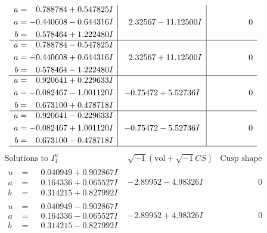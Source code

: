 \documentclass[1p]{elsarticle_modified}
\theoremstyle{definition}
\newcommand{\I}{\sqrt{-1}}
\begin{document}
$$\begin{array}{c|c|c}
\begin{aligned}
u &= \phantom{-}0.788784 + 0.547825 I \\
a &= -0.440608 - 0.644316 I \\
b &= \phantom{-}0.578464 + 1.222480 I\end{aligned}
 & \phantom{-}2.32567 - 11.12500 I & \phantom{-0.000000 } 0 \\ \hline\begin{aligned}
u &= \phantom{-}0.788784 - 0.547825 I \\
a &= -0.440608 + 0.644316 I \\
b &= \phantom{-}0.578464 - 1.222480 I\end{aligned}
 & \phantom{-}2.32567 + 11.12500 I & \phantom{-0.000000 } 0 \\ \hline\begin{aligned}
u &= \phantom{-}0.920641 + 0.229633 I \\
a &= -0.082467 - 1.001120 I \\
b &= \phantom{-}0.673100 + 0.478718 I\end{aligned}
 & -0.75472 + 5.52736 I & \phantom{-0.000000 } 0 \\ \hline\begin{aligned}
u &= \phantom{-}0.920641 - 0.229633 I \\
a &= -0.082467 + 1.001120 I \\
b &= \phantom{-}0.673100 - 0.478718 I\end{aligned}
 & -0.75472 - 5.52736 I & \phantom{-0.000000 } 0\\
 \hline 
 \end{array}$$\newpage$$\begin{array}{c|c|c}  
\text{Solutions to }I^u_{1}& \I (\text{vol} + \sqrt{-1}CS) & \text{Cusp shape}\\
 \hline 
\begin{aligned}
u &= \phantom{-}0.040949 + 0.902867 I \\
a &= \phantom{-}0.164336 + 0.065527 I \\
b &= \phantom{-}0.314215 + 0.827992 I\end{aligned}
 & -2.89952 - 4.98326 I & \phantom{-0.000000 } 0 \\ \hline\begin{aligned}
u &= \phantom{-}0.040949 - 0.902867 I \\
a &= \phantom{-}0.164336 - 0.065527 I \\
b &= \phantom{-}0.314215 - 0.827992 I\end{aligned}
 & -2.89952 + 4.98326 I & \phantom{-0.000000 } 0 \\ \hline\begin{aligned}

\end{aligned}
\end{array}$$
\end{document}
